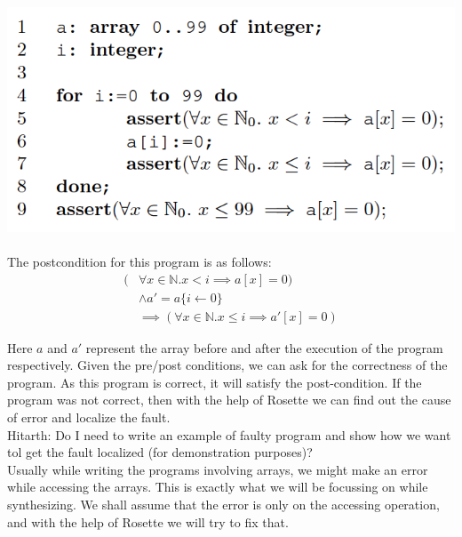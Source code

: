 \documentclass[a4paper, 12pt, notitlepage] {article}
\newcommand{\hcmt}[1]{{\color{magenta} \tiny{Hitarth: {#1}}}}
\begin{document}
\includegraphics[scale=0.6]{arrayprogex} \\
\\

The postcondition for this program is as follows:
\begin{equation}
\begin{split}
(&\forall{x \in \mathbb{N}} . x<i \implies a[x] = 0)  \\
	&\land a' = a\{i \leftarrow 0\} \\
	&\implies (\forall{x \in \mathbb{N}} . x \leq i \implies a'[x] = 0) 
\end{split}
\end{equation}

Here $a$ and $a'$ represent the array before and after the execution of the program respectively.
Given the pre/post conditions, we can ask for the correctness of the program. As this program is correct, it will satisfy the post-condition. If the program was not correct, then with the help of Rosette we can find out the cause of error and localize the fault. \\
\hcmt {Do I need to write an example of faulty program and show how we want tol get the fault localized (for demonstration purposes)?}
\\
Usually while writing the programs involving arrays, we might make an error while accessing the arrays. This is exactly what we will be focussing on while synthesizing. We shall assume that the error is only on the accessing operation, and with the help of Rosette we will try to fix that.\\\\
\end{document}
